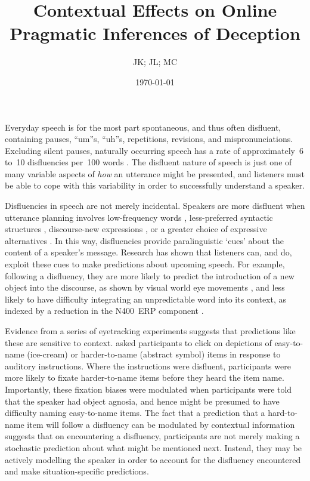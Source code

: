 \documentclass[a4paper,man,natbib]{apa6}
\title{Contextual Effects on Online Pragmatic Inferences of Deception}
\author{JK; JL; MC}
\date{\today}
\newcommand*{\spex}[1]{``{#1}''} %
\begin{document}
\maketitle


\noindent
Everyday speech is for the most part spontaneous, and thus often disfluent, containing pauses, \spex{um}s, \spex{uh}s, repetitions, revisions, and mispronunciations.
Excluding silent pauses, naturally occurring speech has a rate of approximately~6 to~10 disfluencies per~100 words \citep{Bortfeld2001,FoxTree1995}.
The disfluent nature of speech is just one of many variable aspects of \emph{how} an utterance might be presented, and listeners must be able to cope with this variability in order to successfully understand a speaker.

Disfluencies in speech are not merely incidental.  Speakers are more disfluent when utterance planning involves low-frequency words \citep{Beattie1979}, less-preferred syntactic structures \citep{Cook2009}, discourse-new expressions \citep{arnold2000heaviness}, or a greater choice of expressive alternatives \citep{Schachter1991}.
In this way, disfluencies provide paralinguistic `cues' about the content of a speaker's message.
Research has shown that listeners can, and do, exploit these cues to make predictions about upcoming speech.
For example, following a disfluency, they are more likely to predict the introduction of a new object into the discourse, as shown by visual world eye movements \citep{Arnold2004}, and less likely to have difficulty integrating an unpredictable word into its context, as indexed by a reduction in the N400~ERP component \citep{Corley2007}.

Evidence from a series of eyetracking experiments suggests that predictions like these are sensitive to context.
\citet{Arnold2007} asked participants to click on depictions of easy-to-name (ice-cream) or harder-to-name (abstract symbol) items in response to auditory instructions.
Where the instructions were disfluent, participants were more likely to fixate harder-to-name items before they heard the item name.
Importantly, these fixation biases were modulated when participants were told that the speaker had object agnosia, and hence might be presumed to have difficulty naming easy-to-name items.
The fact that a prediction that a hard-to-name item will follow a disfluency can be modulated by contextual information suggests that on encountering a disfluency, participants are not merely making a stochastic prediction about what might be mentioned next.
Instead, they may be actively modelling the speaker in order to account for the disfluency encountered and make situation-specific predictions.
\end{document}
